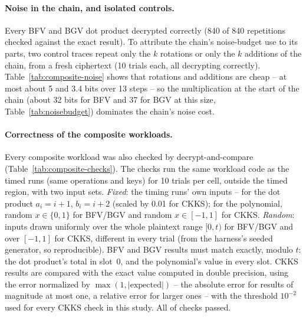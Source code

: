 \paragraph{Noise in the chain, and isolated controls.} Every BFV and BGV dot product decrypted correctly (840 of 840 repetitions checked against the exact result). To attribute the chain's noise-budget use to its parts, two control traces repeat only the $k$ rotations or only the $k$ additions of the chain, from a fresh ciphertext (10 trials each, all decrypting correctly). Table~\ref{tab:composite-noise} shows that rotations and additions are cheap -- at most about 5 and 3.4 bits over 13 steps -- so the multiplication at the start of the chain (about 32 bits for BFV and 37 for BGV at this size, Table~\ref{tab:noisebudget}) dominates the chain's noise cost.

\begin{table}[h!]
\centering\small

\caption{Noise budget left after the full dot product (from a fresh budget of about 112 bits), and the budget used by $k$ rotations alone and $k$ additions alone (rotate-only and add-only controls, from \texttt{seal\_composite\_controls.csv}).}
\label{tab:composite-noise}
\end{table}

\paragraph{Correctness of the composite workloads.} Every composite workload was also checked by decrypt-and-compare (Table~\ref{tab:composite-checks}). The checks run the same workload code as the timed runs (same operations and keys) for 10 trials per cell, outside the timed region, with two input sets. \emph{Fixed}: the timing runs' own inputs -- for the dot product $a_i = i+1$, $b_i = i+2$ (scaled by 0.01 for CKKS); for the polynomial, random $x \in \{0,1\}$ for BFV/BGV and random $x \in [-1,1]$ for CKKS. \emph{Random}: inputs drawn uniformly over the whole plaintext range $[0, t)$ for BFV/BGV and over $[-1,1]$ for CKKS, different in every trial (from the harness's seeded generator, so reproducible). BFV and BGV results must match exactly, modulo $t$: the dot product's total in slot~0, and the polynomial's value in every slot. CKKS results are compared with the exact value computed in double precision, using the error normalized by $\max(1, |\text{expected}|)$ -- the absolute error for results of magnitude at most one, a relative error for larger ones -- with the threshold $10^{-2}$ used for every CKKS check in this study. All \checksPassed{} of \checksTotal{} checks passed.

